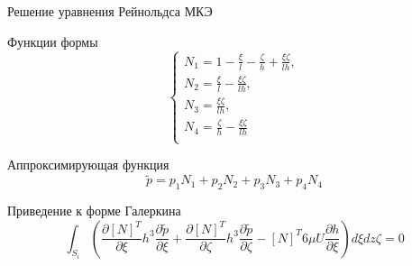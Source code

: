 \documentclass[ignoreonframetext,unicode]{beamer}
\begin{document}
\begin{frame}{Решение уравнения Рейнольдса МКЭ}
		



	\begin{block}{Функции формы}
		\[
			\begin{cases}
				N_1 = 1 - \frac{\xi}{l} - \frac{\zeta}{h} + \frac{\xi  \zeta}{l  h}, \\
				N_2 = \frac{\xi}{l} - \frac{\xi  \zeta}{l  h}, \\
				N_3 = \frac{\xi  \zeta}{l h}, \\
				N_4 = \frac{\zeta}{h} - \frac{\xi  \zeta}{l  h} \\
			\end{cases}
			\label{form-func}
		\]
	\end{block}


\begin{block}{Аппроксимирующая функция}
	\[
	\tilde{p} = p_1 N_1 + p_2 N_2 + p_3 N_3 + p_4 N_4
	\]
\end{block}

\begin{block}{Приведение к форме Галеркина}
	\begin{equation*}
		\int_{S_i} {\left( \frac{\partial[N]^T}{\partial \xi} h^3 \frac{\partial \tilde{p}}{\partial \xi}  +  \frac{\partial[N]^T}{\partial \zeta} h^3 \frac{\partial \tilde{p}}{\partial \zeta}  - [N]^T 6 \mu U \frac{\partial h}{\partial \xi}\right) d\xi dz\zeta} = 0
	\end{equation*}
\end{block}
	
\end{frame}
\end{document}
